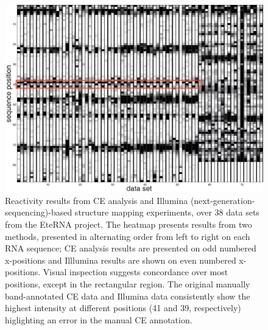 \documentclass[letter]{bioinfo}
\begin{document}
\begin{figure}
\centering
\includegraphics[width=\linewidth]{figures/supp_eterna_comparison}
\caption{Reactivity results from CE analysis and Illumina (next-generation-sequencing)-based structure mapping experiments, over 38 data sets from the EteRNA project. The heatmap presents results from two methods, presented in alternating order from left to right on each RNA sequence; CE analysis results are presented on odd numbered x-positions and Illlumina results are shown on even numbered x-positions. Visual inspection suggests concordance over most positions, except in the rectangular region. The original manually band-annotated CE data and Illumina data consistently show the highest intensity at different positions (41 and 39, respectively) higlighting an error in the manual CE annotation.}
\label{f:eterna_comparison}
\end{figure}
\end{document}
